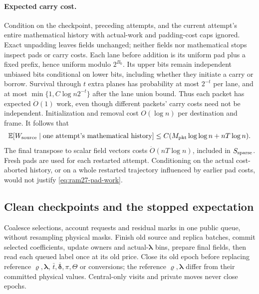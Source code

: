 \documentclass[11pt]{article}
\theoremstyle{remark}
\newcommand{\llambda}{\boldsymbol{\lambda}}
\newcommand{\vvr}{\boldsymbol{\varrho}}
\newcommand{\ddeltabar}{\overline{\boldsymbol{\delta}}}
\newcommand{\Ex}{\mathbb E}
\renewcommand{\O}{\ddot{O}}
\begin{document}
\paragraph{Expected carry cost.}
Condition on the checkpoint, preceding attempts, and the current attempt's
entire mathematical history with actual-work and padding-cost caps ignored.
Exact unpadding leaves fields unchanged; neither fields nor mathematical stops
inspect pads or carry costs.
Each lane before addition is its uniform pad plus a fixed prefix, hence uniform
modulo $2^{B_0}$.
Its upper bits remain independent unbiased bits conditional on lower bits,
including whether they initiate a carry or borrow.
Survival through $t$ extra planes has probability at most $2^{-t}$ per lane, and
at most $\min\{1,C \log n2^{-t}\}$ after the lane union bound.
Thus each packet has expected $\O(1)$ work, even though different packets' carry
costs need not be independent.
Initialization and removal cost $O(\log n)$ per destination and frame.
It follows that
\begin{equation}\label{eq:ram27-pad-work}
 \Ex[W_{\rm source}\mid
                  \text{one attempt's mathematical history}]
                \le C(M_{\rm pkt}\log\log n+nT\log n).
\end{equation}
The final transpose to scalar field vectors costs $\O(nT\log n)$, included in
$S_{\rm sparse}$.
Fresh pads are used for each restarted attempt.
Conditioning on the actual cost-aborted history, or on a whole restarted
trajectory influenced by earlier pad costs, would not justify
\eqref{eq:ram27-pad-work}.

\subsection{Clean checkpoints and the stopped expectation}

Coalesce selections, account requests and residual marks in one public queue,
without resampling physical masks.
Finish old source and replica batches, commit selected coefficients, update
owners and actual-$\llambda$ bins, prepare final fields, then read each queued
label once at its old price.
Close its old epoch before replacing reference $\vvr,\llambda$, $\bar
t,\ddeltabar,\pi,\Theta$ or conversions; the reference $\vvr,\llambda$ differ from
their committed physical values.
Central-only visits and private moves never close epochs.
\end{document}
